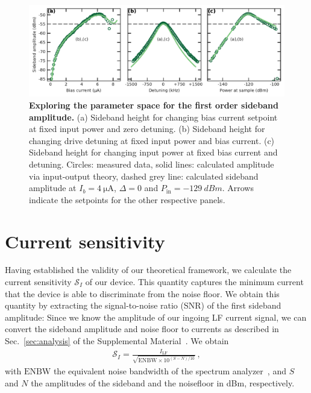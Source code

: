 \begin{figure}[]
	\centering
	\includegraphics[width=\linewidth]{chapter-currentdetection/figures/Figure3}
	\caption{
		\textbf{Exploring the parameter space for the first order sideband amplitude.}
		(a) Sideband height for changing bias current setpoint at fixed input power and zero detuning. %
		(b) Sideband height for changing drive detuning at fixed input power and bias current.
		(c) Sideband height for changing input power at fixed bias current and detuning. %
		Circles: measured data, solid lines: calculated amplitude via input-output theory, dashed grey line: calculated sideband amplitude at $I_b=\SI{4}{\micro\ampere}$, $\Delta=0$ and $P_\text{in}=\SI{-129}{dBm}$.
		Arrows indicate the setpoints for the other respective panels.
		\label{fig:figure3}
	}
\end{figure}

\section{Current sensitivity}

Having established the validity of our theoretical framework, we calculate the current sensitivity $\mathcal{S}_I$ of our device.
% 
This quantity captures the minimum current that the device is able to discriminate from the noise floor.
% 
We obtain this quantity by extracting the signal-to-noise ratio (SNR) of the first sideband amplitude:
% 
Since we know the amplitude of our ingoing LF current signal, we can convert the sideband amplitude and noise floor to currents as described in Sec.~\ref{sec:analysis} of the Supplemental Material~\cite{SeeSupplementalMaterial}.
% 
We obtain
% 
\begin{align}
\mathcal{S}_I = \frac{I_\text{LF}}{\sqrt{\text{ENBW}\times10^{(S-N)/10}}}\ ,
\label{eq:sensitivity}
\end{align}
% 
with $\text{ENBW}$ the equivalent noise bandwidth of the spectrum analyzer~\cite{rauscherFundamentalsSpectrumAnalysis2016}, and $S$ and $N$ the amplitudes of the sideband and the noisefloor in \si{dBm}, respectively.

